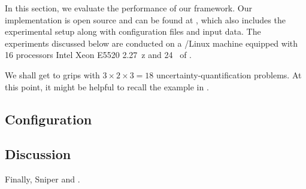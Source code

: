 In this section, we evaluate the performance of our framework. Our
implementation is open source and can be found at \cite{sources}, which also
includes the experimental setup along with configuration files and input data.
The experiments discussed below are conducted on a /Linux machine
equipped with 16 processors Intel Xeon E5520 2.27~z and 24~ of
.

We shall get to grips with $3 \times 2 \times 3 = 18$ uncertainty-quantification
problems.  At this point, it might be helpful to
recall the example in .

\subsection{Configuration} 


\subsection{Discussion}


Finally, Sniper \cite{carlson2011} and  \cite{bienia2011}.
